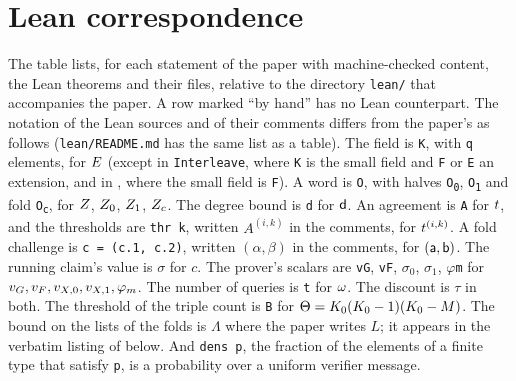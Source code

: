 \section{Lean correspondence}\label{app:lean}

The table lists, for each statement of the paper with machine-checked content, the Lean theorems and their files, relative to the directory \texttt{lean/} that accompanies the paper. A row marked ``by hand'' has no Lean counterpart. The notation of the Lean sources and of their comments differs from the paper's as follows (\texttt{lean/README.md} has the same list as a table). The field is \texttt{K}, with \texttt{q} elements, for $E$ (except in \texttt{Interleave}, where \texttt{K} is the small field and \texttt{F} or \texttt{E} an extension, and in , where the small field is \texttt{F}). A word is \texttt{O}, with halves \texttt{O}\textsubscript{\texttt{0}}, \texttt{O}\textsubscript{\texttt{1}} and fold \texttt{O}\textsubscript{\texttt{c}}, for $Z$, $Z_0$, $Z_1$, $Z_c$. The degree bound is \texttt{d} for $\mathsf{d}$. An agreement is \texttt{A} for $t$, and the thresholds are \texttt{thr k}, written $A^{(i,k)}$ in the comments, for $t^{(i,k)}$. A fold challenge is \texttt{c = (c.1, c.2)}, written $(\alpha,\beta)$ in the comments, for $(\mathsf{a},\mathsf{b})$. The running claim's value is $\sigma$ for $c$. The prover's scalars are \texttt{vG}, \texttt{vF}, $\sigma_0$, $\sigma_1$, $\varphi$\texttt{m} for $v_G,v_F,v_{X,0},v_{X,1},\varphi_m$. The number of queries is \texttt{t} for $\omega$. The discount is $\tau$ in both. The threshold of the triple count is \texttt{B} for $\Theta=K_0(K_0-1)(K_0-M)$. The bound on the lists of the folds is $\Lambda$ where the paper writes $L$; it appears in the verbatim listing of  below. And \texttt{dens p}, the fraction of the elements of a finite type that satisfy \texttt{p}, is a probability over a uniform verifier message.

